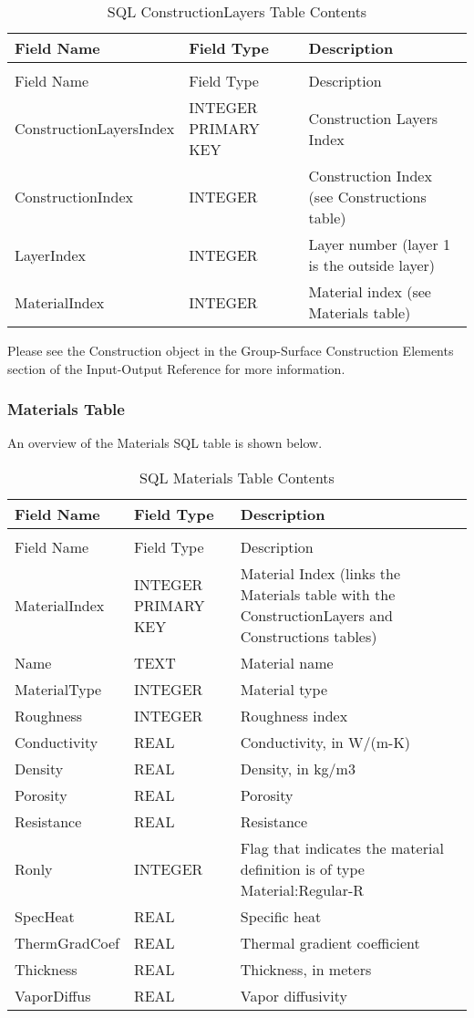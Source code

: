 \begin{longtable}[c]{>{\raggedright}p{1.52in}>{\raggedright}p{1.5in}>{\raggedright}p{2.98in}}
\caption{SQL ConstructionLayers Table Contents \label{table:table-27.-sql-constructionlayers-table}} \tabularnewline
\toprule 
Field Name & Field Type & Description \tabularnewline
\midrule
\endfirsthead

\caption[]{SQL ConstructionLayers Table Contents} \tabularnewline
\toprule 
Field Name & Field Type & Description \tabularnewline
\midrule
\endhead

Construction\-Layers\-Index & INTEGER PRIMARY KEY & Construction Layers Index \tabularnewline
Construction\-Index & INTEGER & Construction Index (see Constructions table) \tabularnewline
LayerIndex & INTEGER & Layer number (layer 1 is the outside layer) \tabularnewline
MaterialIndex & INTEGER & Material index (see Materials table) \tabularnewline
\bottomrule
\end{longtable}

Please see the Construction object in the Group-Surface Construction Elements section of the Input-Output Reference for more information.

\subsubsection{Materials Table}

An overview of the Materials SQL table is shown below.

\begin{longtable}[c]{>{\raggedright}p{1.5in}>{\raggedright}p{1.5in}>{\raggedright}p{3.0in}}
\caption{SQL Materials Table Contents \label{table:table-28.-sql-materials-table-contents}} \tabularnewline
\toprule 
Field Name & Field Type & Description \tabularnewline
\midrule
\endfirsthead

\caption[]{SQL Materials Table Contents} \tabularnewline
\toprule 
Field Name & Field Type & Description \tabularnewline
\midrule
\endhead

MaterialIndex & INTEGER PRIMARY KEY & Material Index (links the Materials table with the ConstructionLayers and Constructions tables) \tabularnewline
Name & TEXT & Material name \tabularnewline
MaterialType & INTEGER & Material type \tabularnewline
Roughness & INTEGER & Roughness index \tabularnewline
Conductivity & REAL & Conductivity, in W/(m-K) \tabularnewline
Density & REAL & Density, in kg/m3 \tabularnewline
Porosity & REAL & Porosity \tabularnewline
Resistance & REAL & Resistance \tabularnewline
Ronly & INTEGER & Flag that indicates the material definition is of type Material:Regular-R \tabularnewline
SpecHeat & REAL & Specific heat \tabularnewline
ThermGrad\-Coef & REAL & Thermal gradient coefficient \tabularnewline
Thickness & REAL & Thickness, in meters \tabularnewline
VaporDiffus & REAL & Vapor diffusivity \tabularnewline
\bottomrule
\end{longtable}

